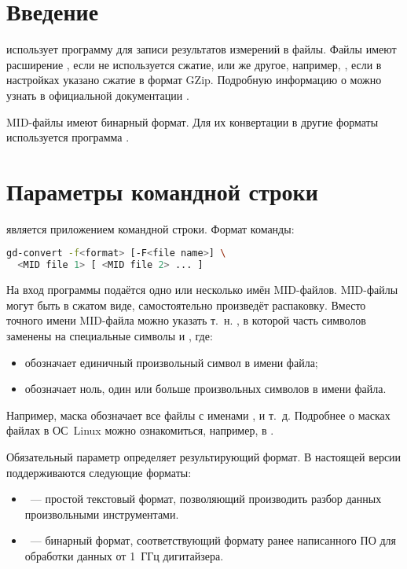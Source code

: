 \section{Введение}

\MIDAS{} использует программу  для записи результатов измерений в файлы. Файлы имеют расширение , если не используется сжатие, или же другое, например, , если в настройках  указано сжатие в формат GZip. Подробную информацию о  можно узнать в официальной документации \cite{MidasWikiMLogger}.

MID-файлы имеют бинарный формат. Для их конвертации в другие форматы используется программа \GDCONVERT{}.

\section{Параметры командной строки}

\GDCONVERT{} является приложением командной строки. Формат команды:

\begin{lstlisting}[language=bash]
gd-convert -f<format> [-F<file name>] \
  <MID file 1> [ <MID file 2> ... ]
\end{lstlisting}

На вход программы подаётся одно или несколько имён MID-файлов. MID-файлы могут быть в сжатом виде, \GDCONVERT{} самостоятельно произведёт распаковку. Вместо точного имени MID-файла можно указать т.~н. , в которой часть символов заменены на специальные символы  и \FILE{*}, где:

\begin{itemize}
\item {} обозначает единичный произвольный символ в имени файла;
\item \FILE{*} обозначает ноль, один или больше произвольных символов в имени файла.
\end{itemize}

Например, маска  обозначает все файлы с именами ,  и т.~д. Подробнее о масках файлах в ОС~Linux можно ознакомиться, например, в \cite{LinuxFileMask}.

Обязательный параметр  определяет результирующий формат. В настоящей версии поддерживаются следующие форматы:

\begin{itemize}
\item {}~--- простой текстовый формат, позволяющий производить разбор данных произвольными инструментами.
\item \CMDARG{binary}~--- бинарный формат, соответствующий формату ранее написанного ПО для обработки данных от 1~ГГц дигитайзера.
\end{itemize}

